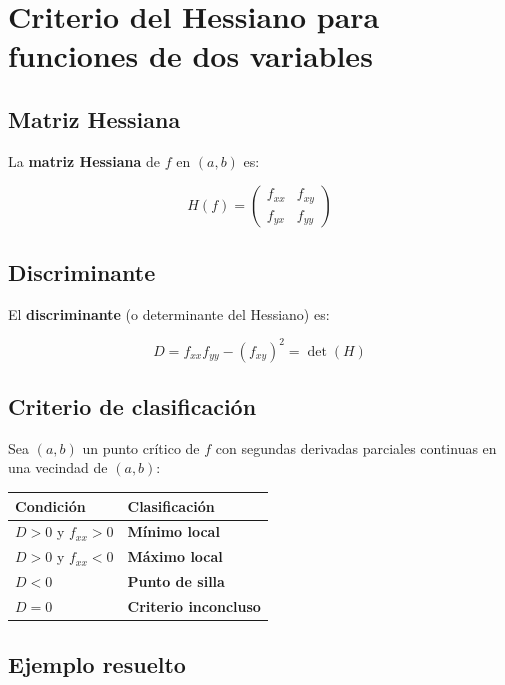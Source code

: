 \documentclass[
]{book}
\begin{document}
\section{Criterio del Hessiano para funciones de dos variables}\label{criterio-del-hessiano-para-funciones-de-dos-variables}

\subsection{Matriz Hessiana}\label{matriz-hessiana}

La \textbf{matriz Hessiana} de \(f\) en \((a, b)\) es:

\[
H(f) = \begin{pmatrix}
f_{xx} & f_{xy} \\
f_{yx} & f_{yy}
\end{pmatrix}
\]

\subsection{Discriminante}\label{discriminante}

El \textbf{discriminante} (o determinante del Hessiano) es:

\[
D = f_{xx} f_{yy} - (f_{xy})^2 = \det(H)
\]

\subsection{Criterio de clasificación}\label{criterio-de-clasificaciuxf3n}

Sea \((a, b)\) un punto crítico de \(f\) con segundas derivadas parciales continuas en una vecindad de \((a, b)\):

\begin{longtable}[]{@{}ll@{}}
\toprule\noalign{}
Condición & Clasificación \\
\midrule\noalign{}
\endhead
\bottomrule\noalign{}
\endlastfoot
\(D > 0\) y \(f_{xx} > 0\) & \textbf{Mínimo local} \\
\(D > 0\) y \(f_{xx} < 0\) & \textbf{Máximo local} \\
\(D < 0\) & \textbf{Punto de silla} \\
\(D = 0\) & \textbf{Criterio inconcluso} \\
\end{longtable}

\subsection{Ejemplo resuelto}\label{ejemplo-resuelto-13}
\end{document}
